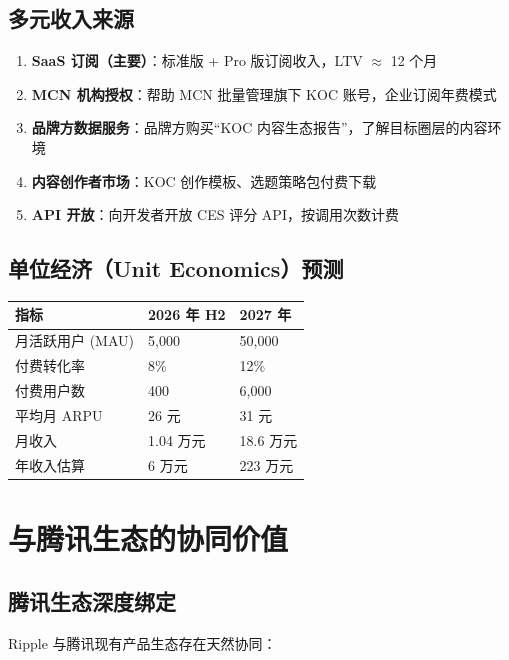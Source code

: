 \documentclass[12pt,a4paper]{ctexart}
\begin{document}
\subsection{多元收入来源}

\begin{enumerate}
  \item \textbf{SaaS 订阅（主要）}：标准版 + Pro 版订阅收入，LTV $\approx$ 12 个月
  \item \textbf{MCN 机构授权}：帮助 MCN 批量管理旗下 KOC 账号，企业订阅年费模式
  \item \textbf{品牌方数据服务}：品牌方购买``KOC 内容生态报告''，了解目标圈层的内容环境
  \item \textbf{内容创作者市场}：KOC 创作模板、选题策略包付费下载
  \item \textbf{API 开放}：向开发者开放 CES 评分 API，按调用次数计费
\end{enumerate}

\subsection{单位经济（Unit Economics）预测}

\begin{center}
\begin{tabular}{p{5cm} p{4cm} p{4cm}}
\toprule
\textbf{指标} & \textbf{2026 年 H2} & \textbf{2027 年} \\
\midrule
月活跃用户 (MAU) & 5,000 & 50,000 \\[2pt]
付费转化率 & 8\% & 12\% \\[2pt]
付费用户数 & 400 & 6,000 \\[2pt]
平均月 ARPU & 26 元 & 31 元 \\[2pt]
月收入 & 1.04 万元 & 18.6 万元 \\[2pt]
年收入估算 & 6 万元 & 223 万元 \\
\bottomrule
\end{tabular}
\end{center}


\section{与腾讯生态的协同价值}

\subsection{腾讯生态深度绑定}

Ripple 与腾讯现有产品生态存在天然协同：
\end{document}

